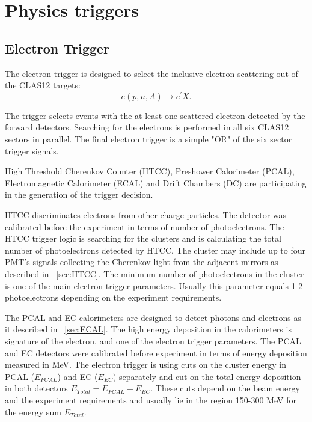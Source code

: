 \section{Physics triggers}






\subsection{Electron Trigger}
The electron trigger is designed to select the inclusive electron scattering out of the CLAS12 targets:
\begin{equation}
e(p,n,A)\rightarrow e^\prime X.
\label{eqn:electron}
\end{equation}
\noindent

The trigger  selects  events with the at least one scattered  electron detected by the forward detectors.
Searching for the electrons is performed  in all six CLAS12 sectors in parallel. The final electron trigger is  a simple "OR" of the six sector trigger signals.

High Threshold Cherenkov Counter (HTCC),  Preshower Calorimeter (PCAL),  Electromagnetic Calorimeter (ECAL) and Drift Chambers (DC) are participating in the generation of the trigger decision.

HTCC discriminates electrons from other charge particles. The detector was calibrated before the experiment in terms of number of photoelectrons. The HTCC trigger logic is searching for the clusters and is calculating the total number of  photoelectrons  detected by HTCC. The cluster may include up to four PMT's signals collecting the Cherenkov light from the adjacent mirrors as described in ~\ref{sec:HTCC}. The minimum number of  photoelectrons in the cluster  is one of the main electron trigger parameters. Usually this parameter equals 1-2 photoelectrons depending on the experiment requirements.

The PCAL and EC calorimeters are designed to detect photons and electrons as it described in ~\ref{sec:ECAL}. The high energy deposition in the calorimeters is signature of the electron, and one of the electron trigger parameters.
The PCAL and EC detectors were calibrated before experiment in terms of energy deposition measured in MeV.
The electron trigger is using cuts on the cluster energy  in PCAL ($E_{PCAL}$) and EC ($E_{EC}$) separately and cut on the total energy deposition in both detectors $E_{Total}=E_{PCAL}+E_{EC}$.
These cuts   depend  on the beam energy and the experiment requirements and usually lie in the region 150-300 MeV for the energy sum $E_{Total}$.

